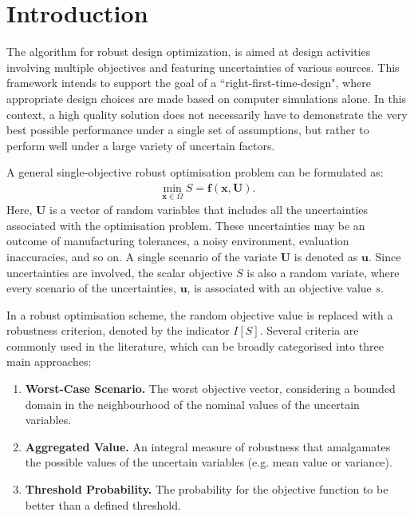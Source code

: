 \documentclass[10pt]{llncs}
\newcommand{\brr}[1]{{\left({#1}\right)}} %
\newcommand{\I}[1]{I\!\left[{#1}\right]} %
\newcommand{\vx}{\mathbf{x}} %
\newcommand{\vf}{\mathbf{f}} %
\newcommand{\vu}{\mathbf{u}} %
\newcommand{\vU}{\mathbf{U}} %
\begin{document}
\section{\label{sec:intro}Introduction}
The algorithm for robust design optimization, is aimed at design activities involving
multiple objectives and featuring uncertainties of various sources. This framework intends to support the goal of a ``right-first-time-design", where appropriate design choices are made based on computer simulations alone. In this context, a high quality solution does not necessarily have to demonstrate the very best possible performance under a single set of assumptions, but rather to perform well under a large variety of uncertain factors.

A general single-objective robust optimisation problem can be formulated as:
\begin{align}
\label{eq:rev:robust}
\min_{\vx\in\Omega} S=\vf\brr{\vx,\vU}.
\end{align}
Here, $\vU$ is a vector of random variables that includes all the uncertainties associated with the optimisation problem.
These uncertainties may be an outcome of manufacturing tolerances, a noisy environment, evaluation inaccuracies, and so on.
A single scenario of the variate $\vU$ is denoted as $\vu$.
Since uncertainties are involved, the scalar objective $S$ is also a random variate, where every scenario of the uncertainties, $\vu$, is associated with an objective value $s$.

In a robust optimisation scheme, the random objective value is replaced with a robustness criterion, denoted by the indicator $\I{S}$.
Several criteria are commonly used in the literature, which can be broadly categorised into three main approaches:
\begin{enumerate}
%
\item \textbf{Worst-Case Scenario.} The worst objective vector, considering a bounded domain in the neighbourhood of the nominal values of the uncertain variables.
%
\item \textbf{Aggregated Value.} An integral measure of robustness that amalgamates the possible values of the uncertain variables (e.g. mean value or variance).
%
\item \textbf{Threshold Probability.} The probability for the objective function to be better than a defined threshold.
\end{enumerate}
\end{document}
